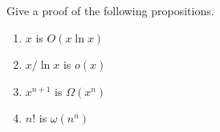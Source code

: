 \documentclass[12pt,oneside]{article}
\begin{document}
\newpage

\begin{problem}
Give a proof of the following propositions.

\begin{enumerate}
\item $x$ is $O\left( x\ln{x} \right)$
\item $x/ \ln{x}$  is $o  \left( x \right)$
\item $x^{n+1}$ is $\Omega \left( x^n \right)$
\item $n!$ is $\omega \left( n^n \right)$
\end{enumerate}

\end{problem}
\end{document}
